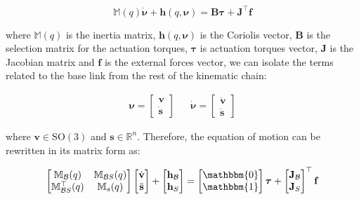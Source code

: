 \begin{equation}
    \mathbb{M}(q)\dot{\boldsymbol{\nu}} + \mathbf{h}(q,\boldsymbol{\nu}) = \mathbf{B}\boldsymbol{\tau} + \mathbf{J} ^\top \mathbf{f}
\end{equation}

where $\mathbb{M}(q)$ is the inertia matrix, $\mathbf{h}(q,\boldsymbol{\nu})$ is the Coriolis vector, $\mathbf{B}$ is the selection matrix for the actuation torques, $\boldsymbol{\tau}$ is actuation torques vector, $\mathbf{J}$ is the Jacobian matrix and $\mathbf{f}$ is the external forces vector, we can isolate the terms related to the base link from the rest of the kinematic chain:

\begin{align}
    \boldsymbol{\nu} =
    \begin{bmatrix}
        \mathrm{\mathbf{v}} \\
        \dot{\mathbf{s}}
    \end{bmatrix} &  &
    \dot{\boldsymbol{\nu}} =
    \begin{bmatrix}
        \dot{\mathrm{\mathbf{v}}} \\
        \ddot{\mathbf{s}}
    \end{bmatrix}
\end{align}

where $\mathrm{\mathbf{v}} \in \mathrm{SO}(3)$ and $\mathbf{s} \in \mathbb{R}^{n}$. Therefore, the equation of motion can be rewritten in its matrix form as:

\begin{equation}
    \begin{bmatrix}
        \mathbb{M} _{\mathcal{B}}(q)        & \mathbb{M} _{\mathcal{B}S}(q) \\
        \mathbb{M} _{\mathcal{B}S} ^\top(q) & \mathbb{M} _s(q)
    \end{bmatrix}
    \begin{bmatrix}
        \dot{\mathrm{\mathbf{v}}} \\
        \ddot{\mathbf{s}}
    \end{bmatrix}+
    \begin{bmatrix}
        \mathbf{h} _{\mathcal{B}} \\
        \mathbf{h} _S
    \end{bmatrix}=
    \begin{bmatrix}
        \mathbbm{0} \\
        \mathbbm{1}
    \end{bmatrix}
    \boldsymbol{\tau}
    +
    \begin{bmatrix}
        \mathbf{J} _{\mathcal{B}} \\
        \mathbf{J} _S
    \end{bmatrix} ^\top
    \mathbf{f}
\end{equation}

